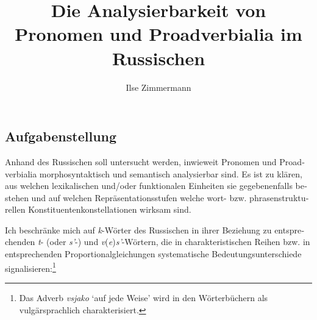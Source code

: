 \documentclass[output=paper, colorlinks, citecolor=brown, booklanguage=german]{langscibook}
\author{Ilse Zimmermann\affiliation{Zentrum für Allgemeine Sprachwissenschaft (ZAS), Berlin}}
\title{Die Analysierbarkeit von Pronomen und Proadverbialia im Russischen}
\begin{document}
\begin{otherlanguage}{german}
\maketitle

%
\baselineskip
\section{Aufgabenstellung}

Anhand des Russischen soll untersucht werden, inwieweit Pronomen und Proadverbialia morphosyntaktisch und semantisch analysierbar sind. Es ist zu klären, aus welchen lexikalischen und/oder funktionalen Einheiten sie gegebenenfalls bestehen und auf welchen Repräsentationsstufen welche wort- bzw. phrasenstrukturellen Konstituentenkonstellationen wirksam sind.

Ich beschränke mich auf \textit{k}-Wörter des Russischen in ihrer Beziehung zu ent\-sprechen\-den \textit{t}- (oder \textit{s'}-) und \textit{v}(\textit{e})\textit{s'}-Wörtern, die in charakteristischen Reihen bzw. in entsprechenden Proportionalgleichungen systematische Be\-deu\-tungs\-unter\-schiede signalisieren:\footnote{\label{fn:1}Das Adverb \textit{vsjako} `auf jede Weise' wird in den Wörterbüchern als vulgärsprachlich charakterisiert.}




\end{otherlanguage}
\end{document}
